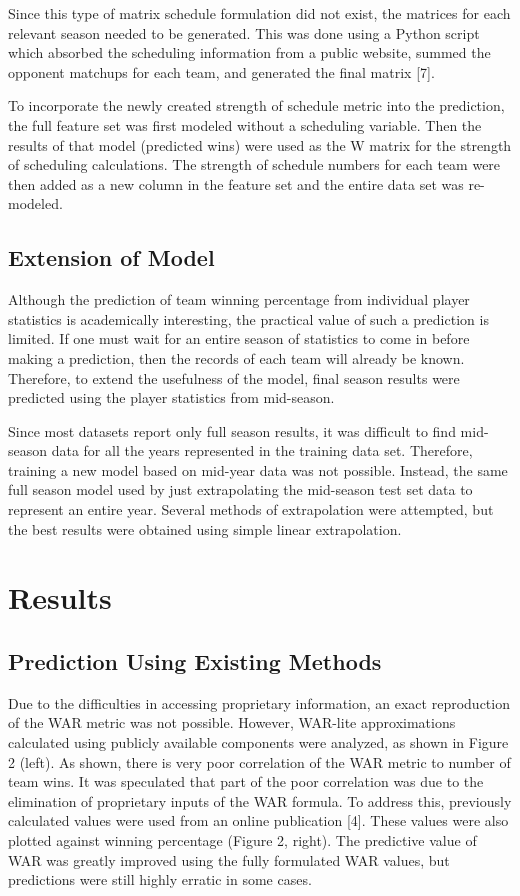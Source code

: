 \documentclass{article} %
\begin{document}
Since this type of matrix schedule formulation did not exist, the matrices for each relevant season needed to be generated.  This was done using a Python script which absorbed the scheduling information from a public website, summed the opponent matchups for each team, and generated the final matrix [7].  

To incorporate the newly created strength of schedule metric into the prediction, the full feature set was first modeled without a scheduling variable.  Then the results of that model (predicted wins) were used as the W matrix for the strength of scheduling calculations.  The strength of schedule numbers for each team were then added as a new column in the feature set and the entire data set was re-modeled.


 \subsection{Extension of Model} 
Although the prediction of team winning percentage from individual player statistics is academically interesting, the practical value of such a prediction is limited. If one must wait for an entire season of statistics to come in before making a prediction, then the records of each team will already be known.  Therefore, to extend the usefulness of the model, final season results were predicted using the player statistics from mid-season.

Since most datasets report only full season results, it was difficult to find mid-season data for all the years represented in the training data set. Therefore, training a new model based on mid-year data was not possible.  Instead, the same full season model used by just extrapolating the mid-season test set data to represent an entire year.  Several methods of extrapolation were attempted, but the best results were obtained using simple linear extrapolation.


\section{Results}
\subsection{Prediction Using Existing Methods}
Due to the difficulties in accessing proprietary information, an exact reproduction of the WAR metric was not possible. However, WAR-lite approximations calculated using publicly available components were analyzed, as shown in Figure 2 (left). As shown, there is very poor correlation of the WAR metric to number of team wins. It was speculated that part of the poor correlation was due to the elimination of proprietary inputs of the WAR formula.  To address this, previously calculated values were used from an online publication [4].  These values were also plotted against winning percentage (Figure 2, right).  The predictive value of WAR was greatly improved using the fully formulated WAR values, but predictions were still highly erratic in some cases.  
\end{document}
